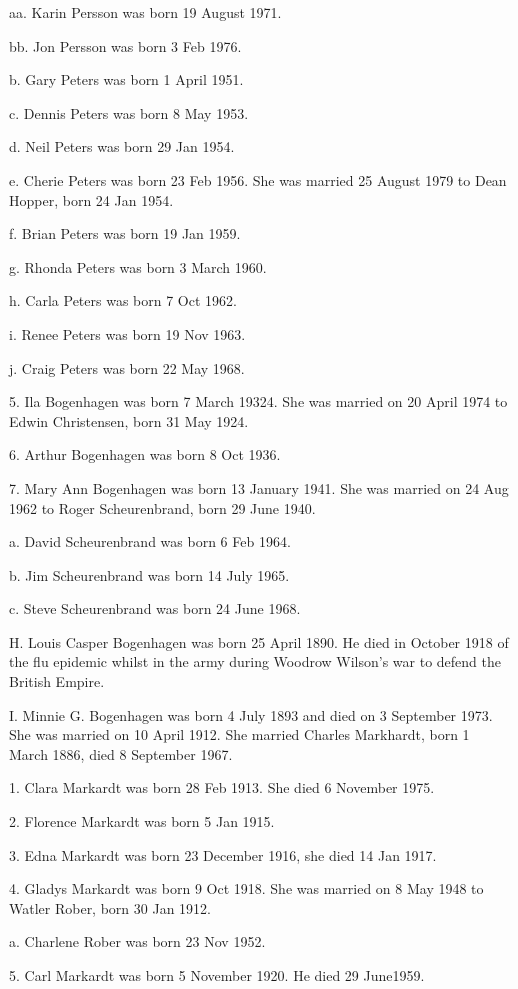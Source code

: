 \documentclass[a4paper]{article}
\begin{document}
aa. Karin Persson was born 19 August 1971.

bb. Jon Persson was born 3 Feb 1976.

b. Gary Peters was born 1 April 1951.

c. Dennis Peters was born 8 May 1953.

d. Neil Peters was born 29 Jan 1954.

e. Cherie Peters was born 23 Feb 1956.  She was married 25 August 1979 to Dean Hopper, born 24 Jan 1954.
 
f. Brian Peters was born 19 Jan 1959.

g. Rhonda Peters was born 3 March 1960.

h. Carla Peters was born 7 Oct 1962.

i. Renee Peters was born 19 Nov 1963.

j. Craig Peters was born 22 May 1968.

5. Ila Bogenhagen was born 7 March 19324.  She was married on 20 April 1974 to Edwin Christensen, born 31 May 1924.
 
6. Arthur Bogenhagen was born 8 Oct 1936.

7. Mary Ann Bogenhagen was born 13 January 1941.  She was married on 24 Aug 1962 to Roger Scheurenbrand, born 29 June 1940.
 
a. David Scheurenbrand was born 6 Feb 1964.

b. Jim Scheurenbrand was born 14 July 1965.

c. Steve Scheurenbrand was born 24 June 1968.

H. Louis Casper Bogenhagen was born 25 April 1890.  He died in October 1918 of the flu epidemic whilst in the army during Woodrow Wilson's war to defend the British Empire.
 
I. Minnie G. Bogenhagen was born 4 July 1893 and died on 3 September 1973.  She was married on 10 April 1912.  She married Charles Markhardt, born 1 March 1886, died 8 September 1967.
 
1. Clara Markardt was born 28 Feb 1913.  She died 6 November 1975.

2. Florence Markardt was born 5 Jan 1915.  

3. Edna Markardt was born 23 December 1916, she died 14 Jan 1917.

4. Gladys Markardt was born 9 Oct 1918.  She was married on 8 May 1948 to Watler Rober, born 30 Jan 1912.  
 
a. Charlene Rober was born 23 Nov 1952.

5. Carl Markardt was born 5 November 1920.  He died 29 June1959.
 
\end{document}

